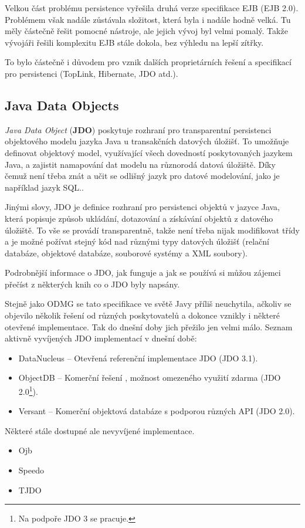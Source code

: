 Velkou část problému persistence vyřešila druhá verze specifikace EJB (EJB 2.0). Problémem však nadále zůstávala složitost, která byla i nadále hodně velká. Tu měly částečně řešit pomocné nástroje, ale jejich vývoj byl velmi pomalý. Takže vývojáři řešili komplexitu EJB stále dokola, bez výhledu na lepší zítřky.

To bylo částečně i důvodem pro vznik dalších proprietárních řešení a specifikací pro persistenci (TopLink, Hibernate, JDO atd.).

\subsection{Java Data Objects}
\emph{Java Data Object} (\textbf{JDO}) poskytuje rozhraní pro transparentní persistenci objektového modelu jazyka Java u transakčních datových úložišť. To umožňuje definovat objektový model, využívající všech dovedností poskytovaných jazykem Java, a zajistit namapování dat modelu na různorodá datová úložiště. Díky čemuž není třeba znát a učit se odlišný jazyk pro datové modelování, jako je například jazyk SQL.\cite{jordan:jdo}.

Jinými slovy, JDO je definice rozhraní pro persistenci objektů v jazyce Java, která popisuje způsob ukládání, dotazování a získávání objektů z datového úložiště. To vše se provádí transparentně, takže není třeba nijak modifikovat třídy a je možné požívat stejný kód nad různými typy datových úložišť (relační databáze, objektové databáze, souborové systémy a XML soubory)\cite{roos:jdo}.

Podrobnější informace o JDO, jak funguje\cite{ezzio:uujdo} a jak se používá\cite{tyagi:cjdo} si můžou zájemci přečíst z některých knih co o JDO byly napsány.

Stejně jako ODMG se tato specifikace ve světě Javy příliš neuchytila, ačkoliv se objevilo několik řešení od různých poskytovatelů a dokonce vznikly i některé otevřené implementace. Tak do dnešní doby jich přežilo jen velmi málo. Seznam aktivně vyvíjených JDO implementací v dnešní době:
\begin{itemize}
  \item DataNucleus -- Otevřená referenční implementace JDO (JDO 3.1).
  \item ObjectDB -- Komerční řešení , možnost omezeného využití zdarma (JDO 2.0\footnote{Na podpoře JDO 3 se pracuje.}).
  \item Versant -- Komerční objektová databáze s podporou různých API (JDO 2.0).
\end{itemize}
Některé stále dostupné ale nevyvíjené implementace.
\begin{itemize}
  \item Ojb
  \item Speedo
  \item TJDO
\end{itemize}

